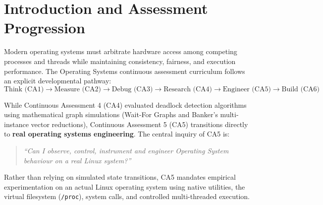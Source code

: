 \documentclass[11pt,a4paper]{article}
\begin{document}
\section{Introduction and Assessment Progression}

Modern operating systems must arbitrate hardware access among competing processes and threads while maintaining consistency, fairness, and execution performance. The Operating Systems continuous assessment curriculum follows an explicit developmental pathway:
\begin{equation}
\text{Think (CA1)} \longrightarrow \text{Measure (CA2)} \longrightarrow \text{Debug (CA3)} \longrightarrow \text{Research (CA4)} \longrightarrow \text{Engineer (CA5)} \longrightarrow \text{Build (CA6)}
\end{equation}

While Continuous Assessment 4 (CA4) evaluated deadlock detection algorithms using mathematical graph simulations (Wait-For Graphs and Banker's multi-instance vector reductions), Continuous Assessment 5 (CA5) transitions directly to \textbf{real operating systems engineering}. The central inquiry of CA5 is:
\begin{quote}
\textit{``Can I observe, control, instrument and engineer Operating System behaviour on a real Linux system?''}
\end{quote}

Rather than relying on simulated state transitions, CA5 mandates empirical experimentation on an actual Linux operating system using native utilities, the virtual filesystem (\texttt{/proc}), system calls, and controlled multi-threaded execution.
\end{document}
